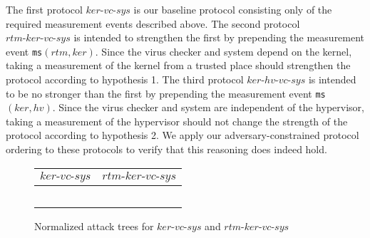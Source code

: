 \documentclass[runningheads]{llncs}
\theoremstyle{definition}
\begin{document}
The first protocol $ker\text{-}vc\text{-}sys$ is our baseline protocol consisting only of the required measurement events described above. The second protocol $rtm\text{-}ker\text{-}vc\text{-}sys$ is intended to strengthen the first by prepending the measurement event \texttt{ms}$(rtm,ker)$. Since the virus checker and system depend on the kernel, taking a measurement of the kernel from a trusted place should strengthen the protocol according to hypothesis 1. The third protocol $ker\text{-}hv\text{-}vc\text{-}sys$ is intended to be no stronger than the first by prepending the measurement event \texttt{ms}$(ker,hv)$. Since the virus checker and system are independent of the hypervisor, taking a measurement of the hypervisor should not change the strength of the protocol according to hypothesis 2. We apply our adversary-constrained protocol ordering to these protocols to verify that this reasoning does indeed hold.

\begin{figure}[h]
    \begin{center}
        \begin{tabular}{ M{6cm} | M{6cm} }
                $ker\text{-}vc\text{-}sys$ & $rtm\text{-}ker\text{-}vc\text{-}sys$ \\
                \hline
                &\\ 
                 \hspace{.03cm}  
                &  \hspace{.03cm}  \\ 
                &\\
                 \hspace{.03cm}  
                &    \\
                 
                 &  \\ 
            \end{tabular}
    \end{center}
    \caption{Normalized attack trees for $ker\text{-}vc\text{-}sys$ and $rtm\text{-}ker\text{-}vc\text{-}sys$}
    \label{fig:rtm-compare-reduced}
\end{figure}
\end{document}
